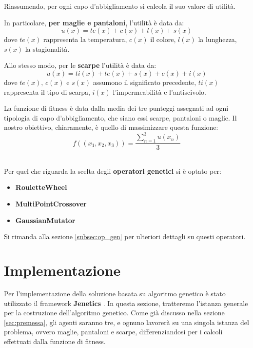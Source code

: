 \documentclass[a4paper, 11pt, oneside]{report}
\begin{document}
            \newpage
            \par \noindent Riassumendo, per ogni capo d'abbigliamento si calcola il suo valore di utilità.
            \\
            \par \noindent In particolare, \textbf{per maglie e pantaloni}, l'utilità è data da:
            \[
                u(x)=te(x)+c(x)+l(x)+s(x)
            \]
            dove $te(x)$ rappresenta la temperatura, $c(x)$ il colore, $l(x)$ la lunghezza, $s(x)$ la stagionalità.
            \\
            \par \noindent Allo stesso modo, per le \textbf{scarpe} l'utilità è data da:
            \[
                u(x)=ti(x)+te(x)+s(x)+c(x)+i(x)
            \]
            dove $te(x)$, $c(x)$ e $s(x)$ assumono il significato precedente, $ti(x)$ rappresenta il tipo di scarpa,
            $i(x)$ l'impermeabilità e l'antiscivolo.
            \\
            \par \noindent La funzione di fitness è data dalla media dei tre punteggi assegnati
            ad ogni tipologia di capo d'abbigliamento, che siano essi scarpe, pantaloni o maglie.
            Il nostro obiettivo, chiaramente, è quello di massimizzare questa funzione:
            \[
                f((x_{1},x_{2},x_{3}))=\frac{\sum_{n=1}^{3} u(x_{n})}{3}
            \]
            \\
            \par \noindent Per quel che riguarda la scelta degli \textbf{operatori genetici} si è optato per:
            \begin{itemize}
                \item \textbf{RouletteWheel}
                \item \textbf{MultiPointCrossover}
                \item \textbf{GaussianMutator}
            \end{itemize}
            Si rimanda alla sezione \ref{subsec:op_gen} per ulteriori dettagli su questi operatori.

            \newpage
            \section{Implementazione}
            Per l'implementazione della soluzione basata su algoritmo genetico è stato utilizzato il framework
            \textbf{Jenetics} \cite{1}.
            In questa sezione, tratteremo l'istanza generale per la costruzione dell'algoritmo genetico.
            Come già discusso nella sezione \ref{sec:premessa}, gli agenti saranno tre, e ognuno lavorerà su una singola istanza
            del problema, ovvero maglie, pantaloni e scarpe, differenziandosi per i calcoli effettuati dalla funzione di
            fitness.
\end{document}
